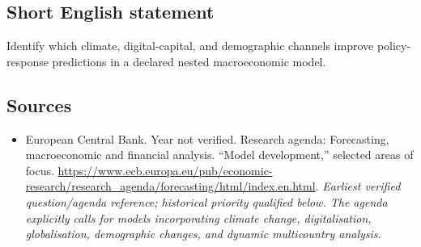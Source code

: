 \documentclass[11pt]{article}
\begin{document}
\subsection{Short English statement}
Identify which climate, digital-capital, and demographic channels improve policy-response predictions in a declared nested macroeconomic model.

\subsection{Sources}
\begin{itemize}\raggedright
\item[\textnormal{[S1]}]\hypertarget{source:30007521:1}{} European Central Bank. Year not verified. Research agenda: Forecasting, macroeconomic and financial analysis. “Model development,” selected areas of focus.
\url{https://www.ecb.europa.eu/pub/economic-research/research_agenda/forecasting/html/index.en.html}.
{\small\textit{Earliest verified question/agenda reference; historical priority qualified below. The agenda explicitly calls for models incorporating climate change, digitalisation, globalisation, demographic changes, and dynamic multicountry analysis.}}
\end{itemize}
\end{document}
